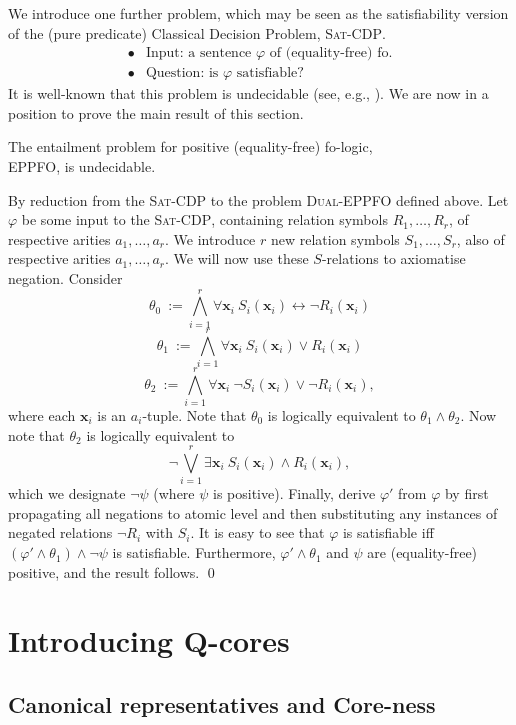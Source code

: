 \documentclass{LMCS}
\newcommand{\tuple}[1]{\ensuremath{\mathbf{#1}}}
\begin{document}
We introduce one further problem, which may be seen as the satisfiability version of the (pure predicate) Classical Decision Problem, \textsc{Sat-CDP}.
\[
\begin{array}{ll}
\bullet & \mbox{Input: a sentence $\varphi$ of (equality-free) fo.} \\
\bullet & \mbox{Question: is $\varphi$ satisfiable?} 
\end{array}
\]
It is well-known that this problem is undecidable (see, e.g., \cite{CDP}). We are now in a position to prove the main result of this section.
\begin{thm}
The entailment problem for positive (equality-free) fo-logic, \\ \textsc{EPPFO}, is undecidable.
\end{thm}
\proof
By reduction from the \textsc{Sat-CDP} to the problem \textsc{Dual-EPPFO} defined above. Let $\varphi$ be some input to the \textsc{Sat-CDP}, containing relation symbols $R_1,\ldots,R_r$, of respective arities $a_1,\ldots,a_r$. We introduce $r$ new relation symbols $S_1,\ldots,S_r$, also of respective arities $a_1,\ldots,a_r$. We will now use these $S$-relations to axiomatise negation. Consider
\[ \theta_0 \ := \bigwedge_{i=1}^{r} \forall \tuple{x}_i  \ S_i(\tuple{x}_i) \leftrightarrow  \neg R_i(\tuple{x}_i) \]
\[ \theta_1 \ := \bigwedge_{i=1}^{r} \forall \tuple{x}_i  \ S_i(\tuple{x}_i) \vee R_i(\tuple{x}_i) \]
\[ \theta_2 \ := \bigwedge_{i=1}^{r} \forall \tuple{x}_i  \ \neg S_i(\tuple{x}_i) \vee \neg R_i(\tuple{x}_i), \]
where each $\tuple{x}_i$ is an $a_i$-tuple. Note that $\theta_0$ is logically equivalent to $\theta_1 \wedge \theta_2$. Now note that $\theta_2$ is logically equivalent to 
\[ \neg \bigvee_{i=1}^{r} \exists \tuple{x}_i  \ S_i(\tuple{x}_i) \wedge R_i(\tuple{x}_i),  \]
which we designate $\neg \psi$ (where $\psi$ is positive). Finally, derive $\varphi'$ from $\varphi$ by first propagating all negations to atomic level and then substituting any instances of negated relations $\neg R_i$ with $S_i$. It is easy to see that $\varphi$ is satisfiable iff $(\varphi' \wedge \theta_1) \wedge \neg \psi$ is satisfiable. Furthermore, $\varphi' \wedge \theta_1$ and $\psi$ are (equality-free) positive, and the result follows.
\qed

\section{Introducing Q-cores}
\label{sec:Q-cores}

\subsection{Canonical representatives and Core-ness}
\label{sec:core-ness}
\end{document}
